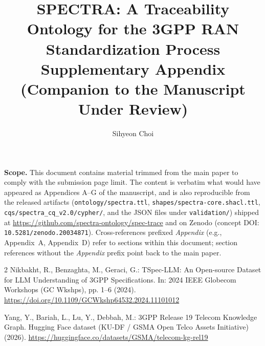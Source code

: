 \documentclass[runningheads]{llncs}
\title{SPECTRA: A Traceability Ontology for the 3GPP RAN Standardization Process\\[2pt]
\large Supplementary Appendix (Companion to the Manuscript Under Review)}
\author{Sihyeon Choi}
\institute{System LSI Business, Device Solutions Division,\\
Samsung Electronics, South Korea\\
\email{shyun12.choi@samsung.com}}
\newcommand{\bk}{\hspace{0pt plus 0pt}\discretionary{}{}{}}
\begin{document}
\maketitle

\noindent\textbf{Scope.} This document contains material trimmed from the
main paper to comply with the submission page limit. The content is verbatim what would have appeared as Appendices
A--G of the manuscript, and is also reproducible from the released
artifacts (\texttt{ontology/spectra.ttl}, \texttt{shapes/spectra-core.shacl.ttl},
\texttt{cqs/spectra\bk\_cq\bk\_v2.0/cypher/}, and the JSON files under
\texttt{validation/}) shipped at \url{https://github.com/spectra-ontology/spec-trace}
and on Zenodo (concept DOI: \texttt{10.5281/zenodo.20034871}). Cross-references prefixed \emph{Appendix} (e.g.,
Appendix~A, Appendix~D) refer to sections within this document; section
references without the \emph{Appendix} prefix point back to the main
paper.



\begin{thebibliography}{2}
Nikbakht, R., Benzaghta, M., Geraci, G.: {TSpec-LLM}: An Open-source Dataset for {LLM} Understanding of {3GPP} Specifications. In: 2024 IEEE Globecom Workshops (GC Wkshps), pp. 1--6 (2024). \url{https://doi.org/10.1109/GCWkshp64532.2024.11101012}

Yang, Y., Bariah, L., Lu, Y., Debbah, M.: {3GPP} Release 19 Telecom Knowledge Graph. Hugging Face dataset (KU-DF / GSMA Open Telco Assets Initiative) (2026). \url{https://huggingface.co/datasets/GSMA/telecom-kg-rel19}
\end{thebibliography}
\end{document}
